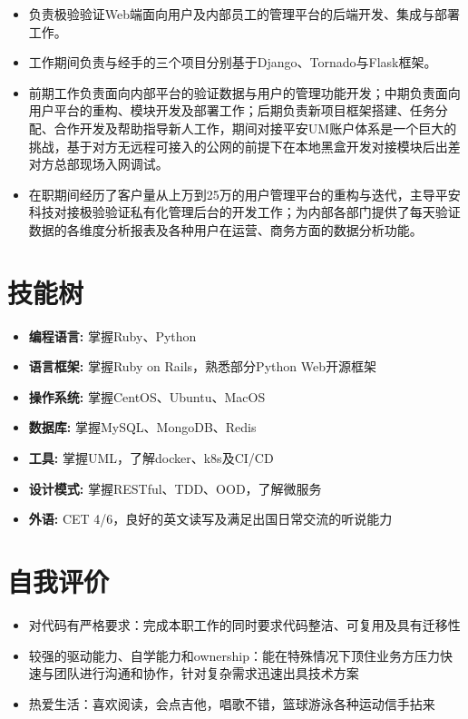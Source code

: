\documentclass[11pt, a4paper,sans]{moderncv}   %
\begin{document}
\begin{itemize}
    \begin{itemize}\yahei
      \item 负责极验验证Web端面向用户及内部员工的管理平台的后端开发、集成与部署工作。
      \item 工作期间负责与经手的三个项目分别基于Django、Tornado与Flask框架。
      \item 前期工作负责面向内部平台的验证数据与用户的管理功能开发；中期负责面向用户平台的重构、模块开发及部署工作；后期负责新项目框架搭建、任务分配、合作开发及帮助指导新人工作，期间对接平安UM账户体系是一个巨大的挑战，基于对方无远程可接入的公网的前提下在本地黑盒开发对接模块后出差对方总部现场入网调试。
      \item 在职期间经历了客户量从上万到25万的用户管理平台的重构与迭代，主导平安科技对接极验验证私有化管理后台的开发工作；为内部各部门提供了每天验证数据的各维度分析报表及各种用户在运营、商务方面的数据分析功能。
    \end{itemize}

\end{itemize}
\vspace{-8pt}

\section{\yahei 技能树}
\begin{itemize}
  \item{\yahei \textbf{编程语言:} 掌握Ruby、Python}
  \item{\yahei \textbf{语言框架:} 掌握Ruby on Rails，熟悉部分Python Web开源框架}
  \item{\yahei \textbf{操作系统:} 掌握CentOS、Ubuntu、MacOS}
  \item{\yahei \textbf{数据库:} 掌握MySQL、MongoDB、Redis}
  \item{\yahei \textbf{工具:} 掌握UML，了解docker、k8s及CI/CD}
  \item{\yahei \textbf{设计模式:} 掌握RESTful、TDD、OOD，了解微服务}
  \item{\yahei \textbf{外语:} CET 4/6，良好的英文读写及满足出国日常交流的听说能力}
\end{itemize}
\vspace{-8pt}

\section{\yahei 自我评价}

\begin{itemize}
  \item{\yahei 对代码有严格要求：完成本职工作的同时要求代码整洁、可复用及具有迁移性}
  \item{\yahei 较强的驱动能力、自学能力和ownership：能在特殊情况下顶住业务方压力快速与团队进行沟通和协作，针对复杂需求迅速出具技术方案}
  \item{\yahei 热爱生活：喜欢阅读，会点吉他，唱歌不错，篮球游泳各种运动信手拈来}
\end{itemize}
\end{document}
